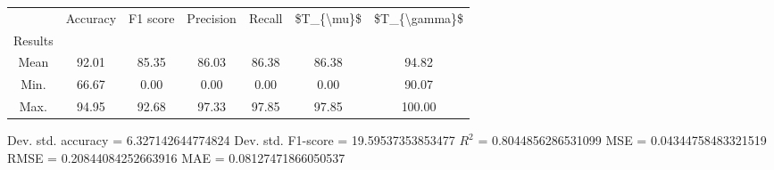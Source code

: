 \begin{tabular}{|c|c|c|c|c|c|c|}
\toprule
{} &  Accuracy &  F1 score &  Precision &  Recall &  \$T\_\{\textbackslash mu\}\$ &  \$T\_\{\textbackslash gamma\}\$ \\
Results &           &           &            &         &            &               \\
\hline
Mean    &     92.01 &     85.35 &      86.03 &   86.38 &      86.38 &         94.82 \\
Min.    &     66.67 &      0.00 &       0.00 &    0.00 &       0.00 &         90.07 \\
Max.    &     94.95 &     92.68 &      97.33 &   97.85 &      97.85 &        100.00 \\
\bottomrule
\end{tabular}

 Dev. std. accuracy = 6.327142644774824
 Dev. std. F1-score = 19.59537353853477
 $R^2$ = 0.8044856286531099
 MSE = 0.04344758483321519
 RMSE = 0.20844084252663916
 MAE = 0.08127471866050537